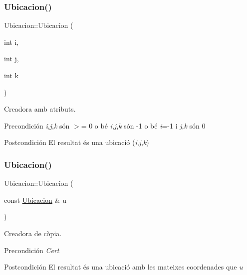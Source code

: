 \subsubsection{\texorpdfstring{Ubicacion()}{Ubicacion()}\hspace{0.1cm}{\footnotesize\ttfamily [2/3]}}
{\footnotesize\ttfamily Ubicacion\+::\+Ubicacion (\begin{DoxyParamCaption}\item[{int}]{i,  }\item[{int}]{j,  }\item[{int}]{k }\end{DoxyParamCaption})}



Creadora amb atributs. 

\begin{DoxyPrecond}{Precondición}
{\itshape i},{\itshape j},{\itshape k} són $>$= 0 o bé {\itshape i},{\itshape j},{\itshape k} són -\/1 o bé {\itshape i}=-\/1 i {\itshape j},{\itshape k} són 0 
\end{DoxyPrecond}
\begin{DoxyPostcond}{Postcondición}
El resultat és una ubicació ({\itshape i},{\itshape j},{\itshape k}) 
\end{DoxyPostcond}
\mbox{\label{class_ubicacion_abbd148f34df6cde35f0f3803c8a98660}} 
\subsubsection{\texorpdfstring{Ubicacion()}{Ubicacion()}\hspace{0.1cm}{\footnotesize\ttfamily [3/3]}}
{\footnotesize\ttfamily Ubicacion\+::\+Ubicacion (\begin{DoxyParamCaption}\item[{const \hyperlink{class_ubicacion}{Ubicacion} \&}]{u }\end{DoxyParamCaption})}



Creadora de còpia. 

\begin{DoxyPrecond}{Precondición}
{\itshape Cert} 
\end{DoxyPrecond}
\begin{DoxyPostcond}{Postcondición}
El resultat és una ubicació amb les mateixes coordenades que {\itshape u} 
\end{DoxyPostcond}
\mbox{\label{class_ubicacion_a90a99154b92c9c89053b752f775618d1}} 
